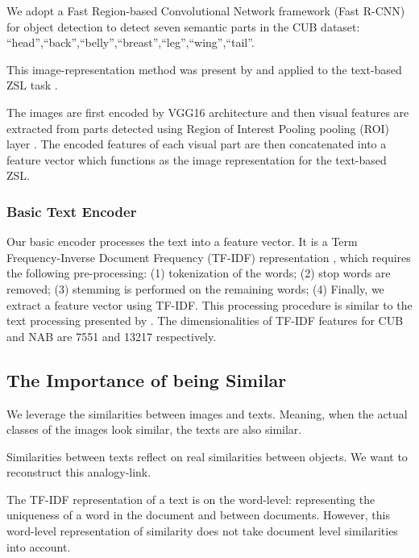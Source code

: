 \documentclass[11pt,a4paper]{article}
\begin{document}
We adopt a 
Fast Region-based Convolutional Network framework (Fast R-CNN) for object detection   \citep{girshick2015fast} to detect seven semantic parts in the CUB dataset:
\enquote{head},\enquote{back},\enquote{belly},\enquote{breast},\enquote{leg},\enquote{wing},\enquote{tail}.\par
This image-representation method was present by \citet{zhang2016spda} and applied to the text-based ZSL task \cite{zhu2018generative,elhoseiny2017link} . \par

The images are first encoded by VGG16 architecture \citep{simonyan2014very} and then visual features are extracted from parts detected using Region of Interest Pooling pooling (ROI) layer \citep{girshick2015fast}. %
The encoded features of each visual part are then concatenated into a feature vector which functions as the image representation for the text-based ZSL.


\subsubsection{Basic Text Encoder}
\label{section:Text_Encoder}
Our basic encoder processes the text into a feature vector. It is a Term Frequency-Inverse Document Frequency (TF-IDF)  representation \citep{salton1988term}, which requires the following pre-processing: (1) tokenization of the words; (2) stop words are removed; (3) stemming is performed on the remaining words; (4) Finally, we extract a feature vector using TF-IDF. This processing procedure is similar to the text processing presented by \citet{zhu2018generative}.
The dimensionalities of TF-IDF features for
CUB and NAB are 7551 and 13217 respectively. 


\subsection{The Importance of being Similar}

We leverage the similarities between images and texts. Meaning, when the actual classes of the images look similar, the texts are also similar.

Similarities between texts reflect on real similarities between objects. We want to reconstruct this analogy-link.


The TF-IDF representation of a text is on the word-level: representing the uniqueness of a word in the document and between documents. However, this word-level representation of similarity does not take document level similarities into account. \par
\end{document}

